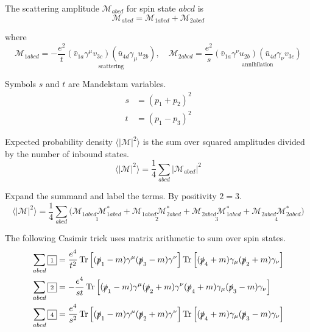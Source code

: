The scattering amplitude $\mathcal M_{abcd}$ for spin state $abcd$ is
\begin{equation*}
\mathcal M_{abcd}=\mathcal M_{1abcd}+\mathcal M_{2abcd}
\end{equation*}

where
\begin{equation*}
\mathcal M_{1abcd}=-\frac{e^2}{t}
\underset{\text{scattering}}
{(\bar v_{1a}\gamma^\mu v_{3c})(\bar u_{4d}\gamma_\mu u_{2b})},
\quad
\mathcal M_{2abcd}=\frac{e^2}{s}
\underset{\text{annihilation}}
{(\bar v_{1a}\gamma^\nu u_{2b})(\bar u_{4d}\gamma_\nu v_{3c})}
\end{equation*}

Symbols $s$ and $t$ are Mandelstam variables.
\begin{align*}
s&=(p_1+p_2)^2
\\
t&=(p_1-p_3)^2
\end{align*}

Expected probability density $\langle|\mathcal M|^2\rangle$
is the sum over squared amplitudes divided by the number of inbound states.
\begin{equation*}
\langle|\mathcal M|^2\rangle=\frac{1}{4}\sum_{abcd}|\mathcal M_{abcd}|^2
\end{equation*}

Expand the summand and label the terms.
By positivity $\boxed{\scriptstyle2}=\boxed{\scriptstyle3}$.
\begin{equation*}
\langle|\mathcal{M}|^2\rangle=\frac{1}{4}
\sum_{abcd}
\bigl(
\underset{\boxed{\scriptstyle1}}{\mathcal M_{1abcd}\mathcal M_{1abcd}^*}+
\underset{\boxed{\scriptstyle2}}{\mathcal M_{1abcd}\mathcal M_{2abcd}^*}+
\underset{\boxed{\scriptstyle3}}{\mathcal M_{2abcd}\mathcal M_{1abcd}^*}+
\underset{\boxed{\scriptstyle4}}{\mathcal M_{2abcd}\mathcal M_{2abcd}^*}
\bigr)
\end{equation*}

The following Casimir trick uses matrix arithmetic to sum over spin states.
\begin{align*}
\sum_{abcd}{\boxed{\scriptstyle1}}
&=\frac{e^4}{t^2}\operatorname{Tr}\left[
(\slashed p_1-m)\gamma^\mu(\slashed p_3-m)\gamma^\nu
\right]
\operatorname{Tr}\left[
(\slashed p_4+m)\gamma_\mu(\slashed p_2+m)\gamma_\nu
\right]
\\
\sum_{abcd}{\boxed{\scriptstyle2}}
&=-\frac{e^4}{st}\operatorname{Tr}\left[
(\slashed p_1-m)\gamma^\mu(\slashed p_2+m)\gamma^\nu
(\slashed p_4+m)\gamma_\mu(\slashed p_3-m)\gamma_\nu
\right]
\\
\sum_{abcd}{\boxed{\scriptstyle4}}
&=\frac{e^4}{s^2}\operatorname{Tr}\left[
(\slashed p_1-m)\gamma^\mu(\slashed p_2+m)\gamma^\nu
\right]
\operatorname{Tr}\left[
(\slashed p_4+m)\gamma_\mu(\slashed p_3-m)\gamma_\nu
\right]
\end{align*}

